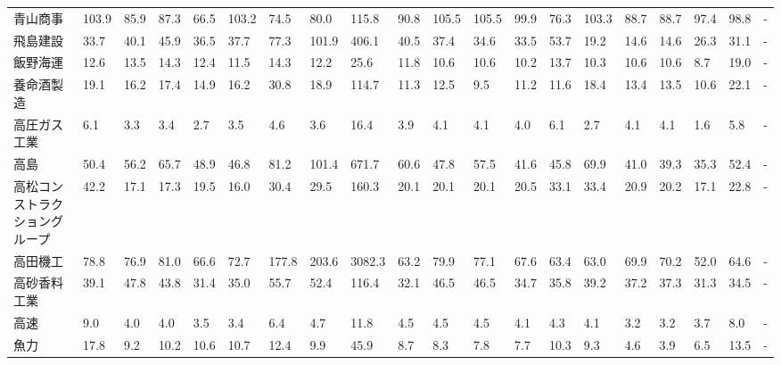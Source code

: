 \begin{tabular}{llllllllllllllllllll}
青山商事            &  103.9 &   85.9 &      87.3 &      66.5 &      103.2 &    74.5 &    80.0 &    115.8 &    90.8 &   105.5 &  105.5 &   99.9 &    76.3 &   103.3 &    88.7 &   88.7 &   97.4 &    98.8 &      - \\
飛島建設            &   33.7 &   40.1 &      45.9 &      36.5 &       37.7 &    77.3 &   101.9 &    406.1 &    40.5 &    37.4 &   34.6 &   33.5 &    53.7 &    19.2 &    14.6 &   14.6 &   26.3 &    31.1 &      - \\
飯野海運            &   12.6 &   13.5 &      14.3 &      12.4 &       11.5 &    14.3 &    12.2 &     25.6 &    11.8 &    10.6 &   10.6 &   10.2 &    13.7 &    10.3 &    10.6 &   10.6 &    8.7 &    19.0 &      - \\
養命酒製造           &   19.1 &   16.2 &      17.4 &      14.9 &       16.2 &    30.8 &    18.9 &    114.7 &    11.3 &    12.5 &    9.5 &   11.2 &    11.6 &    18.4 &    13.4 &   13.5 &   10.6 &    22.1 &      - \\
高圧ガス工業          &    6.1 &    3.3 &       3.4 &       2.7 &        3.5 &     4.6 &     3.6 &     16.4 &     3.9 &     4.1 &    4.1 &    4.0 &     6.1 &     2.7 &     4.1 &    4.1 &    1.6 &     5.8 &      - \\
高島              &   50.4 &   56.2 &      65.7 &      48.9 &       46.8 &    81.2 &   101.4 &    671.7 &    60.6 &    47.8 &   57.5 &   41.6 &    45.8 &    69.9 &    41.0 &   39.3 &   35.3 &    52.4 &      - \\
高松コンストラクショングループ &   42.2 &   17.1 &      17.3 &      19.5 &       16.0 &    30.4 &    29.5 &    160.3 &    20.1 &    20.1 &   20.1 &   20.5 &    33.1 &    33.4 &    20.9 &   20.2 &   17.1 &    22.8 &      - \\
高田機工            &   78.8 &   76.9 &      81.0 &      66.6 &       72.7 &   177.8 &   203.6 &   3082.3 &    63.2 &    79.9 &   77.1 &   67.6 &    63.4 &    63.0 &    69.9 &   70.2 &   52.0 &    64.6 &      - \\
高砂香料工業          &   39.1 &   47.8 &      43.8 &      31.4 &       35.0 &    55.7 &    52.4 &    116.4 &    32.1 &    46.5 &   46.5 &   34.7 &    35.8 &    39.2 &    37.2 &   37.3 &   31.3 &    34.5 &      - \\
高速              &    9.0 &    4.0 &       4.0 &       3.5 &        3.4 &     6.4 &     4.7 &     11.8 &     4.5 &     4.5 &    4.5 &    4.1 &     4.3 &     4.1 &     3.2 &    3.2 &    3.7 &     8.0 &      - \\
魚力              &   17.8 &    9.2 &      10.2 &      10.6 &       10.7 &    12.4 &     9.9 &     45.9 &     8.7 &     8.3 &    7.8 &    7.7 &    10.3 &     9.3 &     4.6 &    3.9 &    6.5 &    13.5 &      - \\

\end{tabular}
